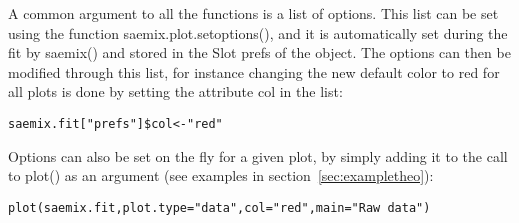 \par \kern -0.5cm
A common argument to all the functions is a list of options. This list can be set using the function {\sf saemix.plot.setoptions()}, and it is automatically set during the fit by {\sf saemix()} and stored in the Slot {\sf prefs} of the object. The options can then be modified through this list, for instance changing the new default color to red for all plots is done by setting the attribute {\sf col} in the list:
\begin{verbatim}
saemix.fit["prefs"]$col<-"red"
\end{verbatim}
Options can also be set on the fly for a given plot, by simply adding it to the call to {\sf plot()} as an argument (see examples in section~\ref{sec:exampletheo}):
\begin{verbatim}
plot(saemix.fit,plot.type="data",col="red",main="Raw data")
\end{verbatim}

